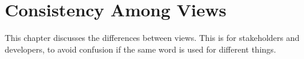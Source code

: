 \chapter{Consistency Among Views}
This chapter discusses the differences between views. This is for stakeholders and developers, to avoid confusion if the same word is used for different things. 

